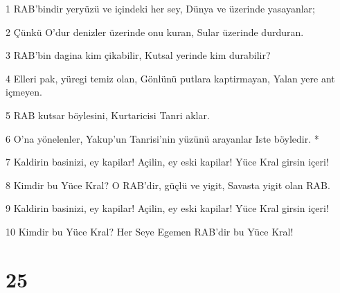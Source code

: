 \par 1 RAB'bindir yeryüzü ve içindeki her sey, Dünya ve üzerinde yasayanlar;
\par 2 Çünkü O'dur denizler üzerinde onu kuran, Sular üzerinde durduran.
\par 3 RAB'bin dagina kim çikabilir, Kutsal yerinde kim durabilir?
\par 4 Elleri pak, yüregi temiz olan, Gönlünü putlara kaptirmayan, Yalan yere ant içmeyen.
\par 5 RAB kutsar böylesini, Kurtaricisi Tanri aklar.
\par 6 O'na yönelenler, Yakup'un Tanrisi'nin yüzünü arayanlar Iste böyledir. *
\par 7 Kaldirin basinizi, ey kapilar! Açilin, ey eski kapilar! Yüce Kral girsin içeri!
\par 8 Kimdir bu Yüce Kral? O RAB'dir, güçlü ve yigit, Savasta yigit olan RAB.
\par 9 Kaldirin basinizi, ey kapilar! Açilin, ey eski kapilar! Yüce Kral girsin içeri!
\par 10 Kimdir bu Yüce Kral? Her Seye Egemen RAB'dir bu Yüce Kral!

\chapter{25}


